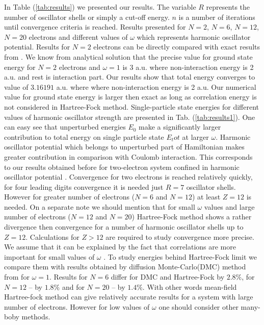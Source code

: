 \documentclass[10pt]{article}
\begin{document}
In Table (\ref{tab:results}) we presented our results. The variable $R$ represents the number of oscillator shells or simply a cut-off energy. $n$ is a number of iterations until convergence criteria is reached. Results presented for $N=2$, $N=6$, $N=12$, $N=20$ electrons and different values of $\omega$ which represents harmonic oscillator potential.
Results for $N=2$ electrons can be directly compared with exact results from \cite{Taut}. We know from analytical solution that the precise value for ground state energy for $N=2$ electrons and $\omega=1$ is 3 a.u. where non-interaction energy is 2 a.u. and rest is interaction part. Our results show that total energy converges to value of $3.16191$ a.u. where where non-interaction energy is 2 a.u. Our numerical value for ground state energy is larger then exact as long as correlation energy is not considered in Hartree-Fock method.
Single-particle state energies for different values of harmonic oscillator strength are presented in Tab. (\ref{tab:results1}). One can easy see that unperturbed energies $E_0$ make a significantly larger contribution to total energy on single particle state $E_tot$ at larger $\omega$. Harmonic oscillator potential which belongs to unperturbed part of Hamiltonian makes greater contribution in comparison with  Coulomb interaction. This corresponds to our results obtained before for two-electron system confined in harmonic oscillator potential \cite{proj2}.
Convergence for two electrons is reached relatively quickly, for four leading digits convergence it is needed just $R=7$ oscillator shells. However for greater number of electrons  ($N=6$ and $N=12$) at least $Z=12$ is needed. On a separate note we should mention that for small $\omega$ values and large number of electrons ($N=12$ and $N=20$) Hartree-Fock method shows a rather divergence then convergence for a number of harmonic oscillator shells up to $Z=12$. Calculations for $Z > 12$ are required to study convergence more precise. We assume that it can be explained by the fact that correlations are more important for small values of $\omega$ \cite{Hjorth-Jensen}.
To study energies behind Hartree-Fock limit we compare them with results obtained by diffusion Monte-Carlo(DMC) method from \cite{Hjorth-Jensen} for $\omega=1$.
Results for $N=6$ differ for DMC and Hartree-Fock by $2.8\%$, for $N=12$ -- by $1.8\%$ and for $N=20$ -- by $1.4\%$. With other words mean-field Hartree-fock method can give relatively accurate results for a system with large number of electrons. However for low values of $\omega$ one should consider other many-boby methods.  
\end{document}
